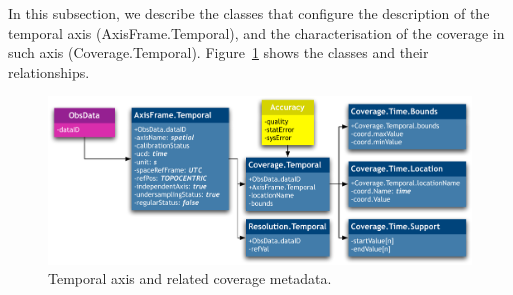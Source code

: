			In this subsection, we describe the classes that
			configure the description of the temporal axis
			(AxisFrame.Temporal), and the characterisation of the
			coverage in such axis (Coverage.Temporal).
			Figure~\ref{figAxisFrameTemporal} shows the classes and
			their relationships.
			
			\begin{figure}[tbp]
				\begin{center}
				\includegraphics[width=\columnwidth]
				{fig/AxisFrame-Temporal-DM}
				\end{center}
				\caption[Temporal axis metadata]{
					Temporal axis and related coverage metadata.
				}
				\label{figAxisFrameTemporal}
			\end{figure}
			
